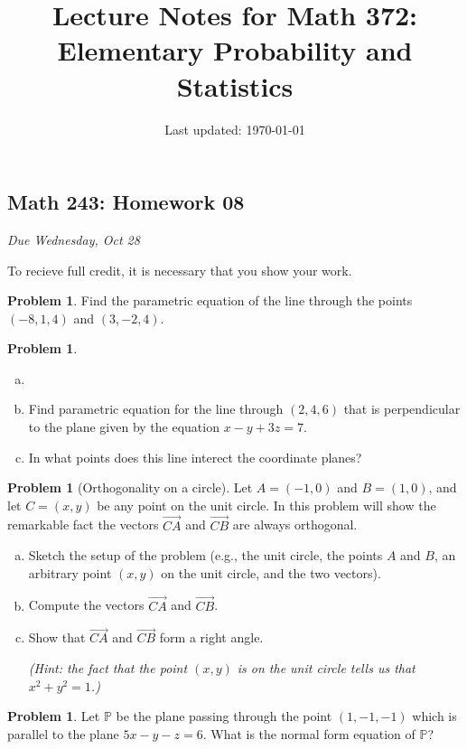 \documentclass[10pt]{article}
\title{Lecture Notes for Math 372: \\Elementary Probability and Statistics}
\date{Last updated: \today}
\theoremstyle{definition}
\newtheorem{problem}[theorem]{Problem}
\newcommand{\1}[1]{\textbf{1}_{\left[#1\right]}} %
\def\P{\mathbb{P}} %
\begin{document}
\begin{center}
  \section*{Math 243: Homework 08}
  \textit{Due Wednesday, Oct 28}
\end{center}

To recieve full credit, it is necessary that you show your work.

\begin{problem}
  Find the parametric equation of the line through the points $(-8,1,4)$ and $(3,-2,4)$.
\end{problem}

\begin{problem}
  \begin{enumerate}[(a)]
    \item[]
    \item Find parametric equation for the line through $(2,4,6)$ that is perpendicular to the plane
    given by the equation $x-y+3z=7$.
    \item In what points does this line interect the coordinate planes?
  \end{enumerate}
\end{problem}



\begin{problem}[Orthogonality on a circle]
  Let $A=(-1,0)$ and $B=(1,0)$, and let $C=(x,y)$ be any point on the unit
  circle. In this problem will show the remarkable fact the vectors $\overrightarrow{CA}$ and
  $\overrightarrow{CB}$ are always orthogonal.
  \begin{enumerate}[(a)]
    \item Sketch the setup of the problem (e.g., the unit circle, the points $A$ and $B$, an arbitrary
    point $(x,y)$ on the unit circle, and the two vectors).
    \item Compute the vectors $\overrightarrow{CA}$ and $\overrightarrow{CB}$.
    \item Show that $\overrightarrow{CA}$ and $\overrightarrow{CB}$ form a right angle.

    \textit{(Hint: the fact that the point $(x,y)$ is on the unit circle tells us that $x^{2}+y^{2}=1$.)}
  \end{enumerate}
\end{problem}

\begin{problem}
  Let $\P$ be the plane passing through the point $(1,-1,-1)$ which is parallel to the plane $5x-y-z=6$.
  What is the normal form equation of $\P$?
\end{problem}
\end{document}
